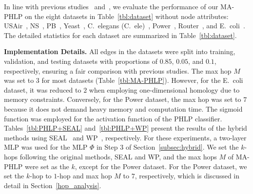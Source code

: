 In line with previous studies~\cite{zhang2018link} and~\cite{pan2021neural}, we evaluate the performance of our MA-PHLP on the eight datasets in Table~\ref{tbl:dataset} without node attributes: USAir~\cite{batagelj2006pajek}, NS~\cite{newman2006finding}, PB~\cite{ackland2005mapping}, Yeast~\cite{von2002comparative}, C.~elegans (C.~ele)~\cite{watts1998collective}, Power~\cite{watts1998collective}, Router~\cite{spring2002measuring}, and E.~coli~\cite{zhang2018beyond}. 
The detailed statistics for each dataset are summarized in Table~\ref{tbl:dataset}.

\noindent\textbf{Implementation Details.} 
All edges in the datasets were split into training, validation, and testing datasets with proportions of $0.85$, $0.05$, and $0.1$, respectively, ensuring a fair comparison with previous studies.
The max hop $M$ was set to $3$ for most datasets (Table~\ref{tbl:MA-PHLP}). 
However, for the E.~coli dataset, it was reduced to $2$ when employing one-dimensional homology due to memory constraints. 
Conversely, for the Power dataset, the max hop was set to $7$ because it does not demand heavy memory and computation time.
The sigmoid function was employed for the activation function of the PHLP classifier.
Tables~\ref{tbl:PHLP+SEAL} and~\ref{tbl:PHLP+WP} present the results of the hybrid methods using SEAL~\cite{zhang2018link} and WP~\cite{pan2021neural}, respectively.
For these experiments, a two-layer MLP was used for the MLP $\Phi$ in Step $3$ of Section~\ref{subsec:hybrid}. 
We set the $k$-hops following the original methods, SEAL and WP, and the max hops $M$ of MA-PHLP were set as the $k$, except for the Power dataset.
For the Power dataset, we set the $k$-hop to $1$-hop and max hop $M$ to $7$, respectively, which is discussed in detail in Section~\ref{hop_analysis}.

